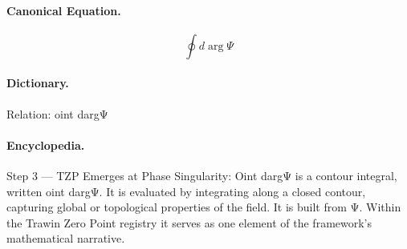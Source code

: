\paragraph{Canonical Equation.}
\[
\oint d\arg\Psi
\]

\paragraph{Dictionary.}
Relation: oint dargΨ

\paragraph{Encyclopedia.}
Step 3 — TZP Emerges at Phase Singularity: Oint dargΨ is a contour integral, written oint dargΨ. It is evaluated by integrating along a closed contour, capturing global or topological properties of the field. It is built from Ψ. Within the Trawin Zero Point registry it serves as one element of the framework's mathematical narrative.
